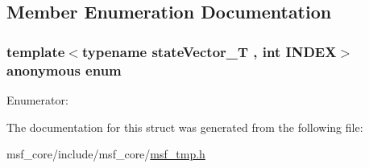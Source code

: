 \subsection{Member Enumeration Documentation}
\hypertarget{structmsf__tmp_1_1getStateIndexInErrorState_a6f6fe71c12d4393db96e8a7c725cbf2f}{\subsubsection[{anonymous enum}]{\setlength{\rightskip}{0pt plus 5cm}template$<$typename state\-Vector\-\_\-\-T , int I\-N\-D\-E\-X$>$ anonymous enum}}\label{structmsf__tmp_1_1getStateIndexInErrorState_a6f6fe71c12d4393db96e8a7c725cbf2f}
\begin{Desc}
\item[Enumerator\-: ]\par
\begin{description}
\item[{\em 
\hypertarget{structmsf__tmp_1_1getStateIndexInErrorState_a6f6fe71c12d4393db96e8a7c725cbf2fa21b2b175ce5d62b85728106fd9a6d990}{value}\label{structmsf__tmp_1_1getStateIndexInErrorState_a6f6fe71c12d4393db96e8a7c725cbf2fa21b2b175ce5d62b85728106fd9a6d990}
}]\end{description}
\end{Desc}



The documentation for this struct was generated from the following file\-:\begin{DoxyCompactItemize}
\item 
msf\-\_\-core/include/msf\-\_\-core/\hyperlink{msf__tmp_8h}{msf\-\_\-tmp.\-h}\end{DoxyCompactItemize}
